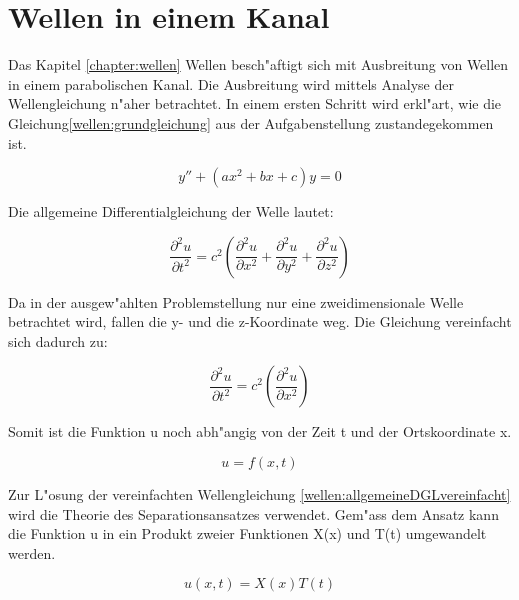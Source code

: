 \chapter{Wellen in einem Kanal\label{chapter:wellen}}
\begin{refsection}
\clearpage

Das Kapitel \ref{chapter:wellen} Wellen besch"aftigt sich mit Ausbreitung von 
Wellen in einem 
parabolischen Kanal. Die Ausbreitung wird mittels Analyse der Wellengleichung 
n"aher betrachtet. In einem ersten Schritt wird erkl"art, wie die 
Gleichung\ref{wellen:grundgleichung} aus der Aufgabenstellung zustandegekommen 
ist.

\begin{equation}
	y'' + (ax^2+bx+c)y
	=
	0
	\label{wellen:grundgleichung}
\end{equation}

Die allgemeine Differentialgleichung der Welle lautet:

\begin{equation}
	\frac{\partial^2 u}{\partial t^2}
	=
	c^2
	\left(
		\frac{\partial^2 u}{\partial x^2} 
		+ \frac{\partial^2 u}{\partial y^2} 
		+ \frac{\partial^2 u}{\partial z^2}
	\right)
	\label{wellen:allgemeineDGL}
\end{equation}

Da in der ausgew"ahlten Problemstellung nur eine zweidimensionale Welle 
betrachtet wird, fallen die y- und die z-Koordinate weg. Die Gleichung 
vereinfacht sich dadurch zu:

\begin{equation}
	\frac{\partial^2 u}{\partial t^2}
	=
	c^2
	\left(
		\frac{\partial^2 u}{\partial x^2} 
	\right)
	\label{wellen:allgemeineDGLvereinfacht}
\end{equation}

Somit ist die Funktion u noch abh"angig von der Zeit t und der Ortskoordinate x.

\begin{equation}
	u = f(x,t)
\end{equation}

Zur L"osung der vereinfachten Wellengleichung 
\ref{wellen:allgemeineDGLvereinfacht} wird die Theorie des Separationsansatzes 
verwendet. Gem"ass dem Ansatz kann die Funktion u in ein Produkt zweier 
Funktionen X(x) und T(t) umgewandelt werden.

\begin{equation}
	u (x,t) = X(x) T(t)
	\label{wellen:separierteFunktion}
\end{equation}


\end{refsection}
